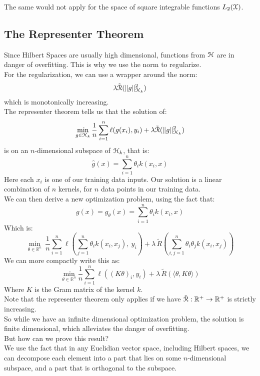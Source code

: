 \documentclass[12pt]{article}
\begin{document}
The same would not apply for the space of 
square integrable functions $L_2(\mathcal{X})$. \\

\newpage

\subsection*{The Representer Theorem}

Since Hilbert Spaces are usually high dimensional,
functions from $\mathcal{H}$ are in danger of overfitting.
This is why we use the norm to regularize. \\
For the regularization, we can use a wrapper
around the norm:
\[ \lambda \tilde{\mathcal{R}}(\|g\|^2_{\mathcal{H}_k}) \]
which is monotonically increasing. \\

The representer theorem tells us that the
solution of:
\[ \min_{g \in \mathcal{H}_k} \dfrac{1}{n}\sum_{i=1}^n 
\ell(g(x_i), y_i) + \lambda 
\tilde{\mathcal{R}}(\|g\|^2_{\mathcal{H}_k}) \]
is on an $n$-dimensional subspace of $\mathcal{H}_k$,
that is:
\[ \hat{g}(x) = \sum_{i=1}^n \theta_i k(x_i, x) \]
Here each $x_i$ is one of our training data inputs.
Our solution is a linear combination of $n$
kernels, for $n$ data points in our training data. \\ 

We can then derive a new optimization problem,
using the fact that:
\[ g(x) = g_\theta(x) = 
\sum_{i=1}^{n} \theta_i k(x_i, x) \]
Which is:
\[ \min_{\theta \in \mathbb{R}^n} \ \frac{1}{n} 
\sum_{i=1}^{n} \ell\left( \sum_{j=1}^{n} 
\theta_i k(x_i, x_j),\ y_i \right) + \lambda\, 
\tilde{R} \left( \sum_{i,j=1}^{n} \theta_i 
\theta_j k(x_i, x_j) \right) \]
We can more compactly write this as:
\[ \min_{\theta \in \mathbb{R}^n} \frac{1}{n} 
\sum_{i=1}^{n} \ell((K\theta)_i, y_i) + \lambda\, 
\tilde{R}(\langle \theta, K\theta \rangle) \]
Where $K$ is the Gram matrix of the kernel $k$. \\

Note that the representer theorem only applies 
if we have 
$\tilde{\mathcal{R}}: \mathbb{R}^+ \to \mathbb{R}^+$ 
is strictly increasing. \\

So while we have an infinite dimensional
optimization problem,
the solution is finite dimensional, 
which alleviates the danger of overfitting. \\

But how can we prove this result? \\
We use the fact that in any Euclidian vector space, 
including Hilbert spaces, 
we can decompose each element into
a part that lies on some $n$-dimensional
subspace, and a part that is orthogonal to
the subspace. \\
\end{document}
